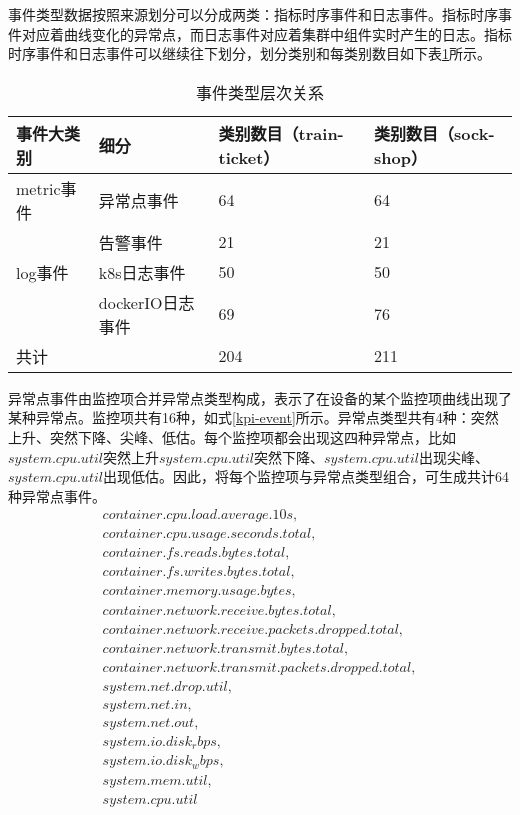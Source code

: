 事件类型数据按照来源划分可以分成两类：指标时序事件和日志事件。指标时序事件对应着曲线变化的异常点，而日志事件对应着集群中组件实时产生的日志。指标时序事件和日志事件可以继续往下划分，划分类别和每类别数目如下表\ref{event-type-level}所示。
\begin{table}[htbp]
    \caption{事件类型层次关系}
    \label{event-type-level}
    \begin{tabular}{llll}
    \hline
    事件大类别    & 细分           & 类别数目（train-ticket） & 类别数目（sock-shop） \\ \hline
    metric事件 & 异常点事件        & 64                 & 64              \\
             & 告警事件         & 21                 & 21              \\ \hline
    log事件    & k8s日志事件      & 50                 & 50              \\
             & dockerIO日志事件 & 69                 & 76              \\ \hline
    共计       &              & 204                & 211             \\ \hline
    \end{tabular}
    \end{table}

异常点事件由监控项合并异常点类型构成，表示了在设备的某个监控项曲线出现了某种异常点。监控项共有16种，如式\ref{kpi-event}所示。异常点类型共有4种：突然上升、突然下降、尖峰、低估。每个监控项都会出现这四种异常点，比如$system.cpu.util$突然上升$system.cpu.util$突然下降、$system.cpu.util$出现尖峰、$system.cpu.util$出现低估。因此，将每个监控项与异常点类型组合，可生成共计64种异常点事件。
\begin{equation}
    \begin{array}{l}
        container.cpu.load.average.10s,\\
        container.cpu.usage.seconds.total,\\
        container.fs.reads.bytes.total,\\
        container.fs.writes.bytes.total,\\
        container.memory.usage.bytes,\\
        container.network.receive.bytes.total,\\
        container.network.receive.packets.dropped.total,\\
        container.network.transmit.bytes.total,\\
        container.network.transmit.packets.dropped.total,\\
        system.net.drop.util,\\
        system.net.in,\\
        system.net.out,\\
        system.io.disk_rbps,\\
        system.io.disk_wbps,\\
        system.mem.util,\\
        system.cpu.util\\ 
    \end{array}
    \label{kpi-event}
\end{equation}

